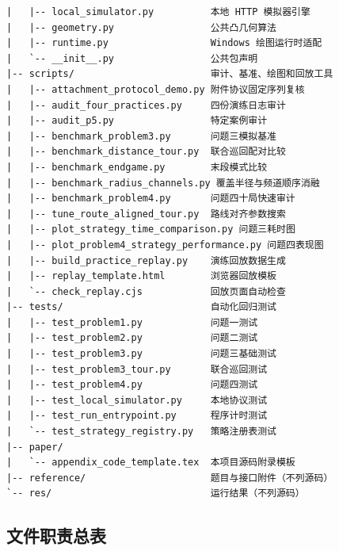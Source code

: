 \begin{Verbatim}[fontsize=\small,frame=single,breaklines=true,breakanywhere=true]
|   |-- local_simulator.py          本地 HTTP 模拟器引擎
|   |-- geometry.py                 公共凸几何算法
|   |-- runtime.py                  Windows 绘图运行时适配
|   `-- __init__.py                 公共包声明
|-- scripts/                        审计、基准、绘图和回放工具
|   |-- attachment_protocol_demo.py 附件协议固定序列复核
|   |-- audit_four_practices.py     四份演练日志审计
|   |-- audit_p5.py                 特定案例审计
|   |-- benchmark_problem3.py       问题三模拟基准
|   |-- benchmark_distance_tour.py  联合巡回配对比较
|   |-- benchmark_endgame.py        末段模式比较
|   |-- benchmark_radius_channels.py 覆盖半径与频道顺序消融
|   |-- benchmark_problem4.py       问题四十局快速审计
|   |-- tune_route_aligned_tour.py  路线对齐参数搜索
|   |-- plot_strategy_time_comparison.py 问题三耗时图
|   |-- plot_problem4_strategy_performance.py 问题四表现图
|   |-- build_practice_replay.py    演练回放数据生成
|   |-- replay_template.html        浏览器回放模板
|   `-- check_replay.cjs            回放页面自动检查
|-- tests/                          自动化回归测试
|   |-- test_problem1.py            问题一测试
|   |-- test_problem2.py            问题二测试
|   |-- test_problem3.py            问题三基础测试
|   |-- test_problem3_tour.py       联合巡回测试
|   |-- test_problem4.py            问题四测试
|   |-- test_local_simulator.py     本地协议测试
|   |-- test_run_entrypoint.py      程序计时测试
|   `-- test_strategy_registry.py   策略注册表测试
|-- paper/
|   `-- appendix_code_template.tex  本项目源码附录模板
|-- reference/                      题目与接口附件（不列源码）
`-- res/                            运行结果（不列源码）
\end{Verbatim}

\subsection{文件职责总表}

